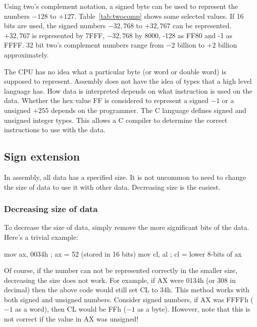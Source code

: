 Using two's complement notation, a signed byte can be used to
represent the numbers $-128$ to $+127$. Table~\ref{tab:twocomp} shows some
selected values. If 16 bits are used, the signed numbers $-32,768$ to 
$+32,767$ can be represented. $+32,767$ is represented by 7FFF, 
$-32,768$ by 8000, -128 as FF80 and -1 as FFFF. 32 bit two's complement 
numbers range from $-2$ billion to $+2$ billion approximately. 


The CPU has no idea what a particular byte (or word or double word) is
supposed to represent. Assembly does not have the idea of types that a
high level language has. How data is interpreted depends on what instruction
is used on the data. Whether the hex value FF is considered to represent
a signed $-1$ or a unsigned $+255$ depends on the programmer. The C language
defines signed and unsigned integer types. This allows a C compiler to
determine the correct instructions to use with the data.


\subsection{Sign extension }

In assembly, all data has a specified size. It is not uncommon to need to
change the size of data to use it with other data. Decreasing size is the
easiest.

\subsubsection{Decreasing size of data}

To decrease the size of data, simply remove the more significant bits of the
data. Here's a trivial example:
\begin{AsmCodeListing}[numbers=none,frame=none]
      mov    ax, 0034h      ; ax = 52 (stored in 16 bits)
      mov    cl, al         ; cl = lower 8-bits of ax
\end{AsmCodeListing}

Of course, if the number can not be represented correctly in the smaller
size, decreasing the size does not work. For example, if {\code AX}
were 0134h (or 308 in decimal) then the above code would still set
{\code CL} to 34h. This method works with both signed and unsigned
numbers.  Consider signed numbers, if {\code AX} was FFFFh ($-1$ as a
word), then {\code CL} would be FFh ($-1$ as a byte). However, note
that this is not correct if the value in {\code AX} was unsigned!


